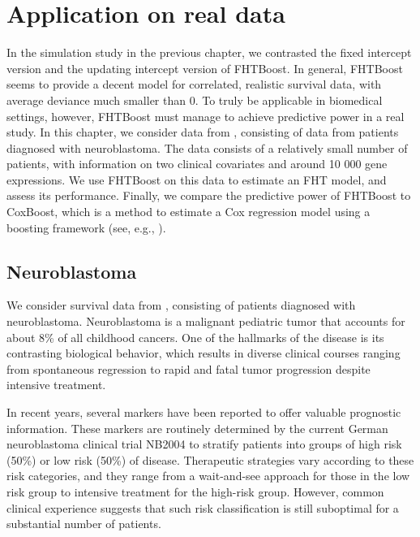 \chapter{Application on real data}
In the simulation study in the previous chapter, we contrasted the fixed intercept version and the updating intercept version of FHTBoost.
In general, FHTBoost seems to provide a decent model for correlated, realistic survival data, with average deviance much smaller than 0.
To truly be applicable in biomedical settings, however, FHTBoost must manage to achieve predictive power in a real study.
In this chapter, we consider data from \citet{oberthuer-data}, consisting of data from patients diagnosed with neuroblastoma.
The data consists of a relatively small number of patients, with information on two clinical covariates and around 10 000 gene expressions.
We use FHTBoost on this data to estimate an FHT model, and assess its performance.
Finally, we compare the predictive power of FHTBoost to CoxBoost, which is a method to estimate a Cox regression model using a boosting framework (see, e.g., \citet{BinderSchumacher2008}).

\section{Neuroblastoma}
We consider survival data from \citet{oberthuer-data}, consisting of patients diagnosed with neuroblastoma.
Neuroblastoma is a malignant pediatric tumor that accounts for about 8\% of all childhood cancers.
One of the hallmarks of the disease is its contrasting biological behavior, which results in diverse clinical courses ranging from spontaneous regression to rapid and fatal tumor progression despite intensive treatment.

In recent years, several markers have been reported to offer valuable prognostic information.
These markers are routinely determined by the current German neuroblastoma clinical trial NB2004 to stratify patients into groups of high risk (50\%) or low risk (50\%) of disease.
Therapeutic strategies vary according to these risk categories, and they range from a wait-and-see approach for those in the low risk group
to intensive treatment for the high-risk group.
However, common clinical experience suggests that such risk classification is still suboptimal for a substantial number of patients.

